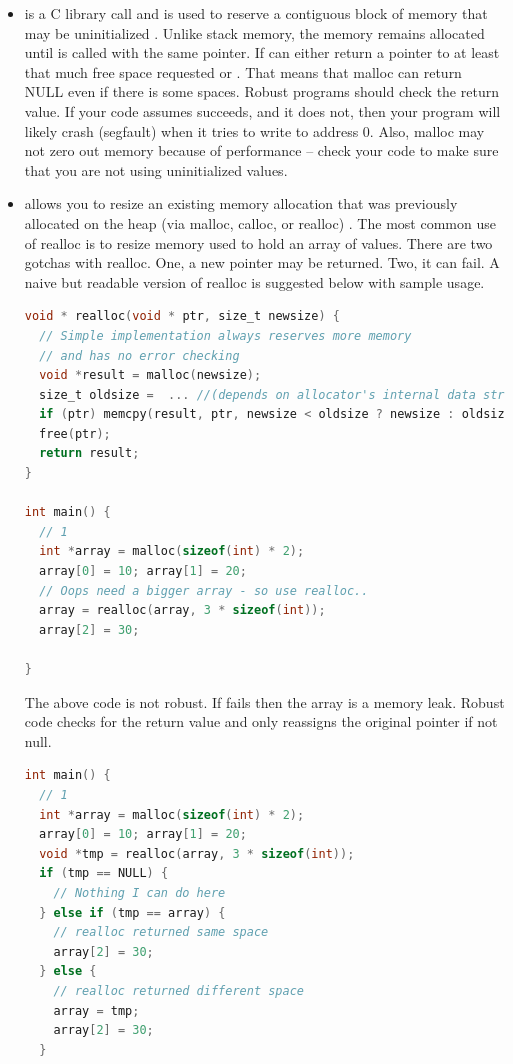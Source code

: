 \begin{itemize}

\item {} is a C library call and is used to reserve a contiguous block of memory that may be uninitialized \cite[P. 348]{jones2010wg14}.
Unlike stack memory, the memory remains allocated until  is called with the same pointer.
If  can either return a pointer to at least that much free space requested or .
That means that malloc can return NULL even if there is some spaces.
Robust programs should check the return value.
If your code assumes  succeeds, and it does not, then your program will likely crash (segfault) when it tries to write to address 0.
Also, malloc may not zero out memory because of performance -- check your code to make sure that you are not using uninitialized values.

\item {} allows you to resize an existing memory allocation that was previously allocated on the heap (via malloc, calloc, or realloc) \cite[P. 349]{jones2010wg14}.
The most common use of realloc is to resize memory used to hold an array of values.
There are two gotchas with realloc.
One, a new pointer may be returned.
Two, it can fail.
A naive but readable version of realloc is suggested below with sample usage.

\begin{lstlisting}[language=C]
void * realloc(void * ptr, size_t newsize) {
  // Simple implementation always reserves more memory
  // and has no error checking
  void *result = malloc(newsize);
  size_t oldsize =  ... //(depends on allocator's internal data structure)
  if (ptr) memcpy(result, ptr, newsize < oldsize ? newsize : oldsize);
  free(ptr);
  return result;
}

int main() {
  // 1
  int *array = malloc(sizeof(int) * 2);
  array[0] = 10; array[1] = 20;
  // Oops need a bigger array - so use realloc..
  array = realloc(array, 3 * sizeof(int));
  array[2] = 30;

}
\end{lstlisting}

The above code is not robust.
If  fails then the array is a memory leak.
Robust code checks for the return value and only reassigns the original pointer if not null.

\begin{lstlisting}[language=C]
int main() {
  // 1
  int *array = malloc(sizeof(int) * 2);
  array[0] = 10; array[1] = 20;
  void *tmp = realloc(array, 3 * sizeof(int));
  if (tmp == NULL) {
    // Nothing I can do here
  } else if (tmp == array) {
    // realloc returned same space
    array[2] = 30;
  } else {
    // realloc returned different space
    array = tmp;
    array[2] = 30;
  }


\end{lstlisting}
\end{itemize}
